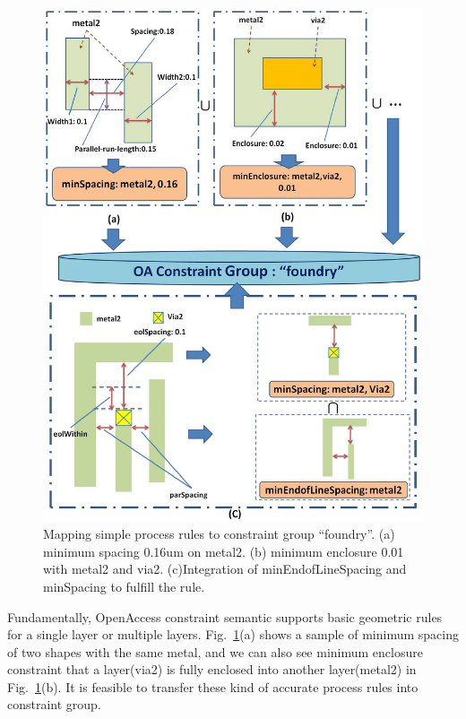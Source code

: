   
  \begin{figure}[t]
    \centering
    \includegraphics[width=\textwidth]{Fig/CG/SimpleRuleCon2.eps}
    \caption{Mapping simple process rules to constraint group ``foundry''. (a) minimum spacing 0.16um on metal2. (b) minimum enclosure 0.01 with metal2 and via2. (c)Integration of minEndofLineSpacing and minSpacing to fulfill the rule.}
    \label{fig:SimruleCon}
  \end{figure}
  
  Fundamentally, OpenAccess constraint semantic supports basic geometric rules for a single layer or multiple layers. Fig.~\ref{fig:SimruleCon}(a) shows a sample of minimum spacing of two shapes with the same metal, and we can also see minimum enclosure constraint that a layer(via2) is fully enclosed into another layer(metal2) in Fig.~\ref{fig:SimruleCon}(b). It is feasible to transfer these kind of accurate process rules into constraint group.

